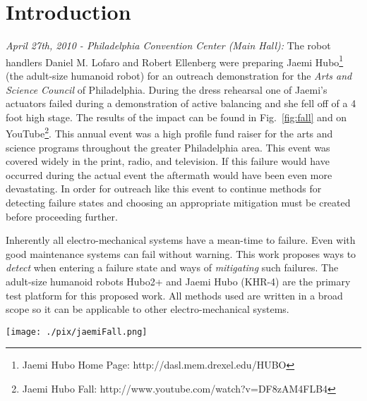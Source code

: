 \section{Introduction}

\textit{April 27th, 2010 - Philadelphia Convention Center (Main Hall):}  The robot handlers Daniel M. Lofaro 
and Robert Ellenberg were preparing Jaemi Hubo\footnote{Jaemi Hubo Home Page: http://dasl.mem.drexel.edu/HUBO} (the adult-size humanoid robot) for an outreach demonstration for the 
\textit{Arts and Science Council} of Philadelphia.  During the dress rehearsal one of Jaemi's actuators failed 
during a demonstration of active balancing and she fell off of a 4 foot high stage.  The results of the impact 
can be found in Fig.~\ref{fig:fall} and on YouTube\footnote{Jaemi Hubo Fall: http://www.youtube.com/watch?v=DF8zAM4FLB4\label{link:fall}}.  
This annual event was a high profile fund raiser for the arts and science programs throughout the greater Philadelphia area.  This event was covered widely in the print, radio, and television.  If this failure would have occurred during the actual event the 
aftermath would have been even more devastating.  In order for outreach like this event to continue methods 
for detecting failure states and choosing an appropriate mitigation must be created before proceeding further.

Inherently all electro-mechanical systems have a mean-time to failure.  Even with good maintenance systems can fail without warning.  This work proposes ways to \textit{detect} when entering a failure state and ways of \textit{mitigating} such failures.  The adult-size humanoid robots Hubo2+ and Jaemi Hubo (KHR-4) are the primary test platform for this proposed work.  All methods used are written in a broad scope so it can be applicable to other electro-mechanical systems.

\begin{figure*}[t]
  \centering
\texttt{[image: ./pix/jaemiFall.png]}
  \caption{Aftermath of the 4 foot fall Jaemi Hubo took after one of her actuators failed during operation.  A video with more images of the aftermath of the failure and further explanation of the event can be seen on YouTube.}%
  \label{fig:fall}
\end{figure*}  

